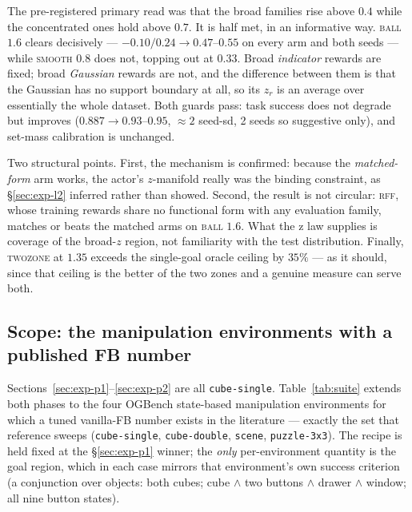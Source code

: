\documentclass[10pt]{article}
\begin{document}
The pre-registered primary read was that the broad families rise above $0.4$ while
the concentrated ones hold above $0.7$. It is half met, in an informative way.
\textsc{ball} $1.6$ clears decisively --- $-0.10/0.24 \to 0.47$--$0.55$ on every
arm and both seeds --- while \textsc{smooth} $0.8$ does not, topping out at $0.33$.
Broad \emph{indicator} rewards are fixed; broad \emph{Gaussian} rewards are not,
and the difference between them is that the Gaussian has no support boundary at
all, so its $z_r$ is an average over essentially the whole dataset.
Both guards pass: task success does not degrade but improves
($0.887\to0.93$--$0.95$, ${\approx}2$ seed-sd, 2 seeds so suggestive only), and
set-mass calibration is unchanged.

Two structural points. First, the mechanism is confirmed: because the
\emph{matched-form} arm works, the actor's $z$-manifold really was the binding
constraint, as \S\ref{sec:exp-l2} inferred rather than showed. Second, the result
is not circular: \textsc{rff}, whose training rewards share no functional form
with any evaluation family, matches or beats the matched arms on \textsc{ball}
$1.6$. What the z law supplies is coverage of the broad-$z$ region, not
familiarity with the test distribution. Finally, \textsc{twozone} at $1.35$
exceeds the single-goal oracle ceiling by $35\%$ --- as it should, since that
ceiling is the better of the two zones and a genuine measure can serve both.

\subsection{Scope: the manipulation environments with a published FB number}
\label{sec:exp-suite}

Sections~\ref{sec:exp-p1}--\ref{sec:exp-p2} are all \texttt{cube-single}.
Table~\ref{tab:suite} extends both phases to the four OGBench state-based manipulation
environments for which a tuned vanilla-FB number exists in the literature
\citep{bagatella2025tdjepa} --- exactly the set that reference sweeps
(\texttt{cube-single}, \texttt{cube-double}, \texttt{scene}, \texttt{puzzle-3x3}).
The recipe is held fixed at the \S\ref{sec:exp-p1} winner; the \emph{only} per-environment
quantity is the goal region, which in each case mirrors that environment's own success
criterion (a conjunction over objects: both cubes; cube $\wedge$ two buttons $\wedge$
drawer $\wedge$ window; all nine button states).
\end{document}
